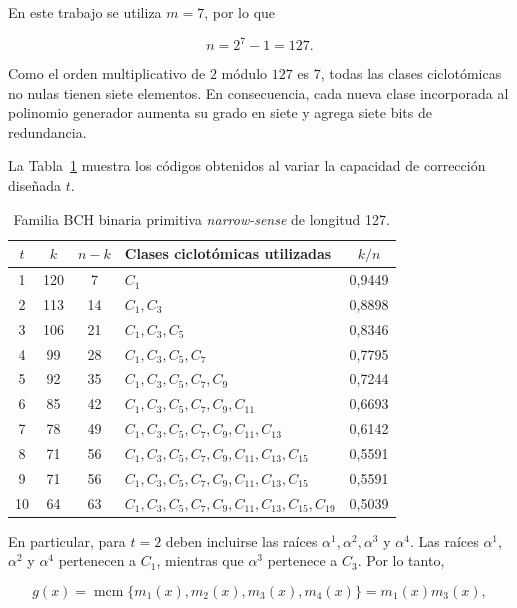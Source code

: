 \documentclass[10pt,a4paper]{article}
\begin{document}
En este trabajo se utiliza $m=7$, por lo que

\begin{equation}
    n=2^7-1=127.
\end{equation}

Como el orden multiplicativo de $2$ módulo $127$ es $7$, todas las clases
ciclotómicas no nulas tienen siete elementos. En consecuencia, cada nueva
clase incorporada al polinomio generador aumenta su grado en siete y agrega
siete bits de redundancia.

La Tabla~\ref{tab:familia-bch-127} muestra los códigos obtenidos al variar la
capacidad de corrección diseñada $t$.

\begin{table}[H]
    \centering
    \small
    \caption{Familia BCH binaria primitiva \textit{narrow-sense} de longitud 127.}
    \label{tab:familia-bch-127}
    \begin{tabular}{@{}c c c p{7.0cm} c@{}}
        \toprule
        $t$ & $k$ & $n-k$ & Clases ciclotómicas utilizadas & $k/n$ \\
        \midrule
         1 & 120 &  7 & $C_1$ & 0,9449 \\
         2 & 113 & 14 & $C_1,C_3$ & 0,8898 \\
         3 & 106 & 21 & $C_1,C_3,C_5$ & 0,8346 \\
         4 &  99 & 28 & $C_1,C_3,C_5,C_7$ & 0,7795 \\
         5 &  92 & 35 & $C_1,C_3,C_5,C_7,C_9$ & 0,7244 \\
         6 &  85 & 42 & $C_1,C_3,C_5,C_7,C_9,C_{11}$ & 0,6693 \\
         7 &  78 & 49 & $C_1,C_3,C_5,C_7,C_9,C_{11},C_{13}$ & 0,6142 \\
         8 &  71 & 56 & $C_1,C_3,C_5,C_7,C_9,C_{11},C_{13},C_{15}$ & 0,5591 \\
         9 &  71 & 56 & $C_1,C_3,C_5,C_7,C_9,C_{11},C_{13},C_{15}$ & 0,5591 \\
        10 &  64 & 63 & $C_1,C_3,C_5,C_7,C_9,C_{11},C_{13},C_{15},C_{19}$ & 0,5039 \\
        \bottomrule
    \end{tabular}
\end{table}

En particular, para $t=2$ deben incluirse las raíces
$\alpha^1,\alpha^2,\alpha^3$ y $\alpha^4$. Las raíces $\alpha^1$,
$\alpha^2$ y $\alpha^4$ pertenecen a $C_1$, mientras que $\alpha^3$
pertenece a $C_3$. Por lo tanto,

\begin{equation}
    g(x)=\operatorname{mcm}\{m_1(x),m_2(x),m_3(x),m_4(x)\}
        =m_1(x)m_3(x),
\end{equation}
\end{document}

